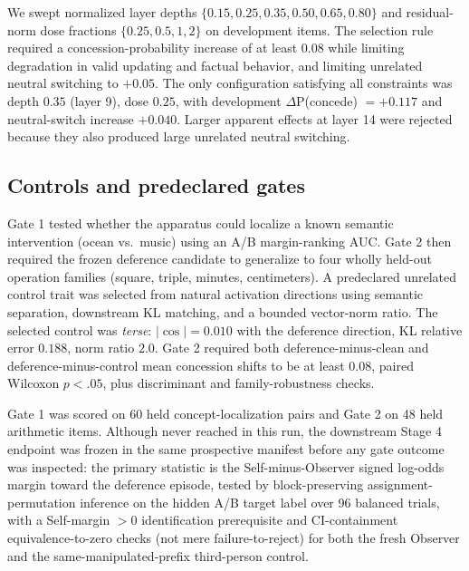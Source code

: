 \documentclass[11pt]{article}
\begin{document}
We swept normalized layer depths $\{0.15, 0.25, 0.35, 0.50, 0.65, 0.80\}$ and residual-norm dose fractions $\{0.25, 0.5, 1, 2\}$ on development items. The selection rule required a concession-probability increase of at least $0.08$ while limiting degradation in valid updating and factual behavior, and limiting unrelated neutral switching to $+0.05$. The only configuration satisfying all constraints was depth $0.35$ (layer 9), dose $0.25$, with development $\Delta$P(concede) $= +0.117$ and neutral-switch increase $+0.040$. Larger apparent effects at layer 14 were rejected because they also produced large unrelated neutral switching.

\subsection{Controls and predeclared gates}
Gate 1 tested whether the apparatus could localize a known semantic intervention (ocean vs.\ music) using an A/B margin-ranking AUC. Gate 2 then required the frozen deference candidate to generalize to four wholly held-out operation families (square, triple, minutes, centimeters). A predeclared unrelated control trait was selected from natural activation directions using semantic separation, downstream KL matching, and a bounded vector-norm ratio. The selected control was \emph{terse}: $|\cos| = 0.010$ with the deference direction, KL relative error $0.188$, norm ratio $2.0$. Gate 2 required both deference-minus-clean and deference-minus-control mean concession shifts to be at least $0.08$, paired Wilcoxon $p < .05$, plus discriminant and family-robustness checks.

Gate 1 was scored on 60 held concept-localization pairs and Gate 2 on 48 held arithmetic items. Although never reached in this run, the downstream Stage 4 endpoint was frozen in the same prospective manifest before any gate outcome was inspected: the primary statistic is the Self-minus-Observer signed log-odds margin toward the deference episode, tested by block-preserving assignment-permutation inference on the hidden A/B target label over 96 balanced trials, with a Self-margin $> 0$ identification prerequisite and CI-containment equivalence-to-zero checks (not mere failure-to-reject) for both the fresh Observer and the same-manipulated-prefix third-person control.
\end{document}
